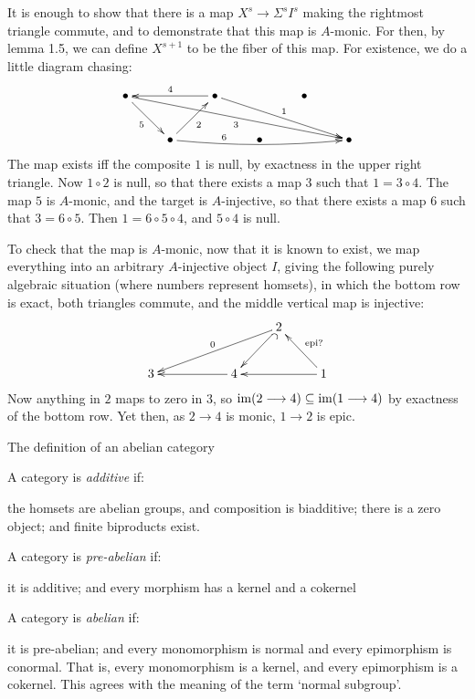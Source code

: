 \documentclass[11pt]{article}
\newcommand{\myheading}[1]
{{\noindent\Large #1}

}
\begin{document}
It is enough to show that there is a map $X^s\to \Sigma^sI^s$ making the
rightmost triangle commute, and to demonstrate that this map is $A$-monic. For
then, by lemma 1.5, we can define $X^{s+1}$ to be the fiber of this map. For
existence, we do a little diagram chasing:
\[\xymatrix{
\bullet\ar[rd]_5\ar[rrrrrd]_3&&\bullet\ar[rrrd]^1\ar[ll]_4&&\bullet\\
&\bullet\ar[ru]_2\ar@/_.31pc/[rrrr]^(.3){6}&&\bullet&&\bullet
}\]
The map exists iff the composite $1$ is null, by exactness in the upper right
triangle. Now $1\circ2$ is null, so that there exists a map $3$ such that
$1=3\circ4$. The map $5$ is $A$-monic, and the target is $A$-injective, so that
there exists a map $6$ such that $3=6\circ5$. Then $1=6\circ5\circ4$, and
$5\circ4$ is null.

To check that the map is $A$-monic, now that it is known to exist, we map
everything into an arbitrary $A$-injective object $I$, giving the following
purely algebraic situation (where numbers represent homsets), in which the
bottom row is exact, both triangles commute, and the middle vertical map is
injective:
\[\xymatrix{
&&&2\ar[lldl]_0\ar@{^{(}->}[ld]\\
3&&\ar[ll]4&&1\ar[ll]\ar[lu]_{\text{epi?}}
}\]
Now anything in $2$ maps to zero in 3, so $\operatorname{im}(2\longrightarrow4)\subseteq\operatorname{im}(1\longrightarrow4)$ by
exactness of the bottom row. Yet then, as $2\to4$ is monic, $1\to2$ is epic.

\pagebreak

\myheading{The definition of an abelian category}
\noindent A category is \emph{additive} if:
\begin{itemise}
\itm the homsets are abelian groups, and composition is biadditive;
\itm there is a zero object; and
\itm finite biproducts exist.
\end{itemise}
A category is \emph{pre-abelian} if:
\begin{itemise}
\itm it is additive; and
\itm every morphism has a kernel and a cokernel
\end{itemise}
A category is \emph{abelian} if:
\begin{itemise}
\itm it is pre-abelian; and
\itm every monomorphism is normal and every epimorphism is conormal. That is,
every monomorphism is a kernel, and every epimorphism is a cokernel. This agrees
with the meaning of the term `normal subgroup'.
\end{itemise}
\end{document}
